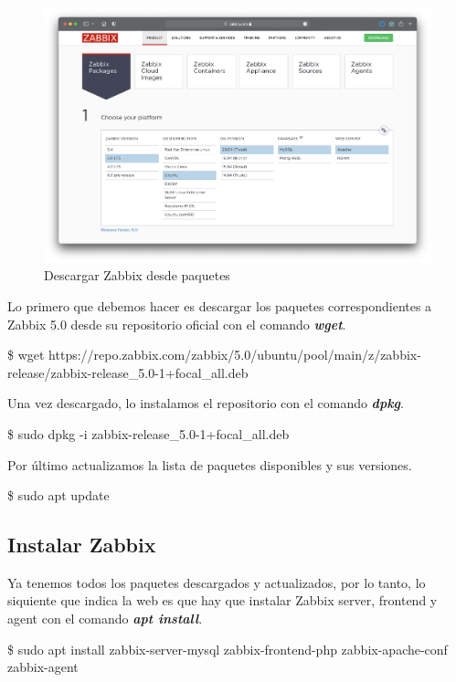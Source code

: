     \begin{figure}[H]
        \centering
        \includegraphics[scale=0.3]{images/zabbix_official.png}
        \caption{Descargar Zabbix desde paquetes}
        \label{fig:zabbix_official}
    \end{figure}

    Lo primero que debemos hacer es descargar los paquetes correspondientes a Zabbix 5.0 desde su repositorio oficial con el comando \textbf{\emph{wget}}. 
        \begin{tcolorbox}[colback=black!10, halign=left]
            \$ wget https://repo.zabbix.com/zabbix/5.0/ubuntu/pool/main/z/zabbix-release/zabbix-release\_5.0-1+focal\_all.deb
        \end{tcolorbox}

    Una vez descargado, lo instalamos el repositorio con el comando \textbf{\emph{dpkg}}.
        \begin{tcolorbox}[colback=black!10, halign=left]
            \$ sudo dpkg -i zabbix-release\_5.0-1+focal\_all.deb
        \end{tcolorbox}

    Por último actualizamos la lista de paquetes disponibles y sus versiones.
        \begin{tcolorbox}[colback=black!10, halign=left]
            \$ sudo apt update
        \end{tcolorbox}

    \newpage
    \subsection{Instalar Zabbix}

    Ya tenemos todos los paquetes descargados y actualizados, por lo tanto, lo siquiente que indica la web es que hay que instalar Zabbix server, frontend
    y agent con el comando \textbf{\emph{apt install}}.
        \begin{tcolorbox}[colback=black!10, halign=left]
            \$ sudo apt install zabbix-server-mysql zabbix-frontend-php zabbix-apache-conf zabbix-agent
        \end{tcolorbox}
    
